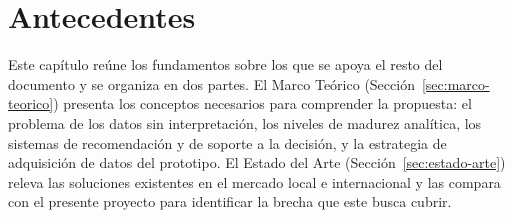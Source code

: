 \chapter{Antecedentes}
\label{cha:antecedentes}

Este capítulo reúne los fundamentos sobre los que se apoya el resto del documento y se organiza en dos partes. El Marco Teórico (Sección~\ref{sec:marco-teorico}) presenta los conceptos necesarios para comprender la propuesta: el problema de los datos sin interpretación, los niveles de madurez analítica, los sistemas de recomendación y de soporte a la decisión, y la estrategia de adquisición de datos del prototipo. El Estado del Arte (Sección~\ref{sec:estado-arte}) releva las soluciones existentes en el mercado local e internacional y las compara con el presente proyecto para identificar la brecha que este busca cubrir.



